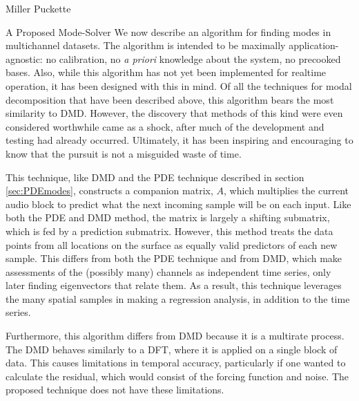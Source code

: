 \documentclass[a4paper,10pt]{report}
\numberwithin{equation}{section}
\begin{document}
\begin{chapter}{Miller Puckette}
\begin{section}{A Proposed Mode-Solver}
We now describe an algorithm for finding modes in multichannel datasets. The algorithm is intended to be maximally application-agnostic: no calibration, no \emph{a priori} knowledge about the system, no precooked bases. Also, while this algorithm has not yet been implemented for realtime operation, it has been designed with this in mind. Of all the techniques for modal decomposition that have been described above, this algorithm bears the most similarity to DMD. However, the discovery that methods of this kind were even considered worthwhile came as a shock, after much of the development and testing had already occurred. Ultimately, it has been inspiring and encouraging to know that the pursuit is not a misguided waste of time.

This technique, like DMD and the PDE technique described in section \ref{sec:PDEmodes}, constructs a companion matrix, $A$, which multiplies the current audio block to predict what the next incoming sample will be on each input. Like both the PDE and DMD method, the matrix is largely a shifting submatrix, which is fed by a prediction submatrix. However, this method treats the data points from all locations on the surface as equally valid predictors of each new sample. This differs from both the PDE technique and from DMD, which make assessments of the (possibly many) channels as independent time series, only later finding eigenvectors that relate them. As a result, this technique leverages the many spatial samples in making a regression analysis, in addition to the time series. 

Furthermore, this algorithm differs from DMD because it is a multirate process. The DMD behaves similarly to a DFT, where it is applied on a single block of data. This causes limitations in temporal accuracy, particularly if one wanted to calculate the residual, which would consist of the forcing function and noise. The proposed technique does not have these limitations.


\end{section}
\end{chapter}
\end{document}
